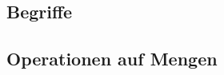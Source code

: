 \subsection{Begriffe}\label{subsec:mengenlehre_begriffe}


\subsection{Operationen auf Mengen}\label{subsec:mengenlehre_operationen-auf-mengen}

